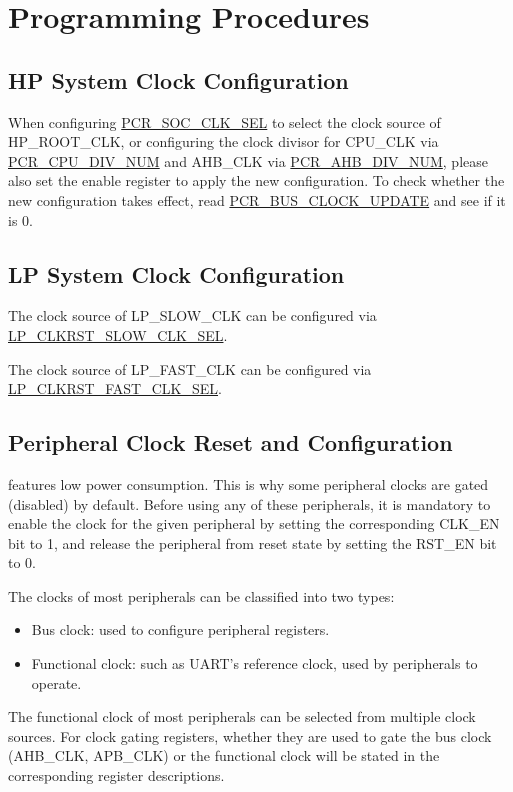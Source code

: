 \documentclass[main\_\_EN.tex]{subfiles}
\begin{document}
\section{Programming Procedures}
\label{sec:resclk-prog-procedures}

\subsection{HP System Clock Configuration}

When configuring \hyperref[fielddesc:PCRSOCCLKSEL]{PCR\_SOC\_CLK\_SEL} to select the clock source of HP\_ROOT\_CLK, or configuring the clock divisor for CPU\_CLK via \hyperref[fielddesc:PCRCPUDIVNUM]{PCR\_CPU\_DIV\_NUM} and AHB\_CLK via \hyperref[fielddesc:PCRAHBDIVNUM]{PCR\_AHB\_DIV\_NUM}, please also set the enable register to apply the new configuration. To check whether the new configuration takes effect, read \hyperref[fielddesc:PCRBUSCLOCKUPDATE]{PCR\_BUS\_CLOCK\_UPDATE} and see if it is 0.

\subsection{LP System Clock Configuration}

The clock source of LP\_SLOW\_CLK can be configured via  \hyperref[fielddesc:LPCLKRSTSLOWCLKSEL]{LP\_CLKRST\_SLOW\_CLK\_SEL}.

The clock source of LP\_FAST\_CLK can be configured via  \hyperref[fielddesc:LPCLKRSTFASTCLKSEL]{LP\_CLKRST\_FAST\_CLK\_SEL}.

\subsection{Peripheral Clock Reset and Configuration}\label{sec:resclk-periperal-clock-configuration}

\begin{importantlisting}
\vspace{-0.5em}

\chipname{} features low power consumption. This is why some peripheral clocks are gated (disabled) by default. Before using any of these peripherals, it is mandatory to enable the clock for the given peripheral by setting the corresponding CLK\_EN bit to 1, and release the peripheral from reset state by setting the RST\_EN bit to 0.
\end{importantlisting}

The clocks of most peripherals can be classified into two types:
\begin{itemize}
    \item Bus clock: used to configure peripheral registers.
    \item Functional clock: such as UART's reference clock, used by peripherals to operate.
\end{itemize}
The functional clock of most peripherals can be selected from multiple clock sources. For clock gating registers, whether they are used to gate the bus clock (AHB\_CLK, APB\_CLK) or the functional clock will be stated in the corresponding register descriptions.
\end{document}
